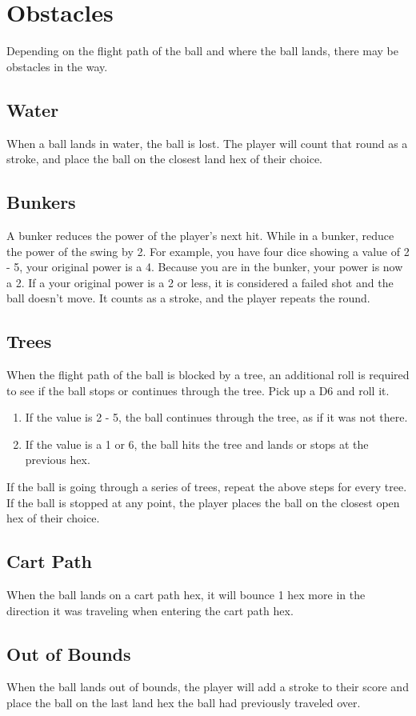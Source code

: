 \documentclass[../main.tex]{subfiles}
\begin{document}
\section{Obstacles}
Depending on the flight path of the ball and where the ball lands, there may be obstacles in the way. 

\subsection{Water}
When a ball lands in water, the ball is lost. The player will count that round as a stroke, and place the ball on the closest land hex of their choice. 

\subsection{Bunkers}
A bunker reduces the power of the player's next hit. While in a bunker, reduce the power of the swing by 2. For example, you have four dice showing a value of 2 - 5, your original power is a 4. Because you are in the bunker, your power is now a 2. If a your original power is a 2 or less, it is considered a failed shot and the ball doesn't move. It counts as a stroke, and the player repeats the round. 

\subsection{Trees}
When the flight path of the ball is blocked by a tree, an additional roll is required to see if the ball stops or continues through the tree. Pick up a D6 and roll it.
\begin{enumerate}
    \item If the value is 2 - 5, the ball continues through the tree, as if it was not there. 
    \item If the value is a 1 or 6, the ball hits the tree and lands or stops at the previous hex. 
\end{enumerate}
If the ball is going through a series of trees, repeat the above steps for every tree. If the ball is stopped at any point, the player places the ball on the closest open hex of their choice. 

\subsection{Cart Path}
When the ball lands on a cart path hex, it will bounce 1 hex more in the direction it was traveling when entering the cart path hex. 

\subsection{Out of Bounds}
When the ball lands out of bounds, the player will add a stroke to their score and place the ball on the last land hex the ball had previously traveled over. 
\end{document}
